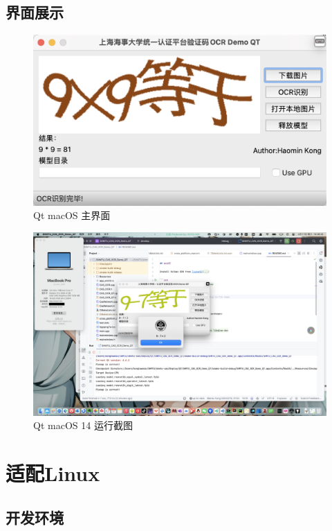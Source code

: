 \subsection{界面展示}

\begin{figure}
	\centering
	\includegraphics[width=0.9\linewidth]{Resources/Picture/Deploy/Qt/macOS/qt_mac_main}
	\caption{Qt macOS 主界面}
	\label{fig:qtmacmain}
\end{figure}

\begin{figure}
	\centering
	\includegraphics[width=0.9\linewidth]{Resources/Picture/Deploy/Qt/macOS/mac}
	\caption{Qt macOS 14 运行截图}
	\label{fig:mac}
\end{figure}

\section{适配Linux}

\subsection{开发环境}

